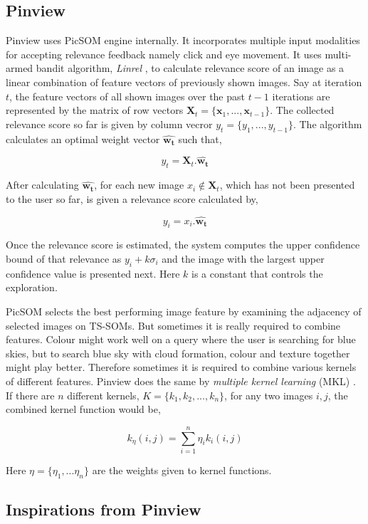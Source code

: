 \documentclass[english]{tktltiki}
\begin{document}
\subsection{Pinview}

Pinview uses PicSOM engine internally. It incorporates multiple input modalities for accepting relevance feedback namely click and eye movement. It uses multi-armed bandit algorithm, \textit{Linrel} \cite{linrel}, to calculate relevance score of an image as a linear combination of feature vectors of previously shown images. Say at iteration $t$, the feature vectors of all shown images over the past $t-1$ iterations are represented by the matrix of row vectors $\mathbf{X}_t = \{\mathbf{x}_1, ..., \mathbf{x}_{t-1}\}$. The collected relevance score so far is given by column vecror $y_t = \{y_1, ..., y_{t-1}\}$. The algorithm calculates an optimal weight vector $\hat{\mathbf{w_t}}$ such that,

$$
y_t = \mathbf{X}_t . \hat{\mathbf{w_t}}
$$

After calculating $\hat{\mathbf{w_t}}$, for each new image $x_i \notin \mathbf{X}_t$, which has not been presented to the user so far, is given a relevance score calculated by,

$$
y_i = x_i . \hat{\mathbf{w_t}}
$$

Once the relevance score is estimated, the system computes the upper confidence bound of that relevance as $y_i + k \sigma_i$ and the image with the largest upper confidence value is presented next. Here $k$ is a constant that controls the exploration.

PicSOM selects the best performing image feature by examining the adjacency of selected images on TS-SOMs. But sometimes it is really required to combine features. Colour might work well on a query where the user is searching for blue skies, but to search blue sky with cloud formation, colour and texture together might play better. Therefore sometimes it is required to combine various kernels of different features. Pinview does the same by \textit{multiple kernel learning} (MKL) \cite{mkl}. If there are $n$ different kernels, $K = \{k_1, k_2, ..., k_n\}$, for any two images $i, j$, the combined kernel function \cite{Pinview} would be,

$$
k_{\eta}(i, j) = \sum_{i=1}^n \eta_i k_i(i, j)
$$

Here $\eta = \{\eta_1, ...\eta_n\}$ are the weights given to kernel functions.

\subsection{Inspirations from Pinview}
\end{document}
